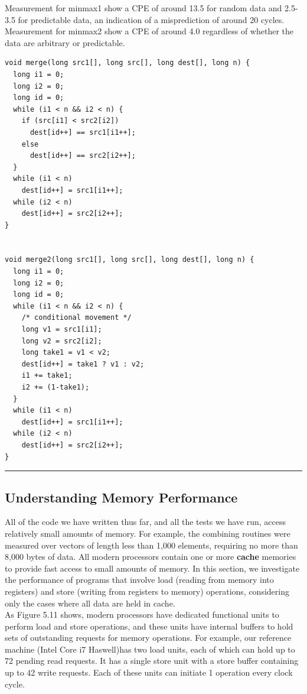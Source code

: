 \documentclass[11pt]{article}
\begin{document}
\begin{enumerate}
\begin{verbatim}
\end{verbatim}

Measurement for minmax1 show a CPE of around 13.5 for random data and 2.5-3.5 for predictable data, an indication of a misprediction of around 20 cycles. Measurement for minmax2 show a CPE of around 4.0 regardless of whether the data are arbitrary or predictable.\\

\begin{verbatim}
void merge(long src1[], long src[], long dest[], long n) {
  long i1 = 0;
  long i2 = 0;
  long id = 0;
  while (i1 < n && i2 < n) {
    if (src[i1] < src2[i2])
      dest[id++] == src1[i1++];
    else
      dest[id++] == src2[i2++];
  }
  while (i1 < n)
    dest[id++] = src1[i1++];
  while (i2 < n)
    dest[id++] = src2[i2++];
}


void merge2(long src1[], long src[], long dest[], long n) {
  long i1 = 0;
  long i2 = 0;
  long id = 0;
  while (i1 < n && i2 < n) {
    /* conditional movement */
    long v1 = src1[i1];
    long v2 = src2[i2];
    long take1 = v1 < v2;
    dest[id++] = take1 ? v1 : v2;
    i1 += take1;
    i2 += (1-take1);
  }
  while (i1 < n)
    dest[id++] = src1[i1++];
  while (i2 < n)
    dest[id++] = src2[i2++];
}

\end{verbatim}

\noindent\rule{\textwidth}{0.5pt}
\end{enumerate}

\subsection{Understanding Memory Performance}
\label{sec:org6b94c04}
All of the code we have written thus far, and all the tests we have run, access relatively small amounts of memory. For example, the combining routines were measured over vectors of length less than 1,000 elements, requiring no more than 8,000 bytes of data. All modern processors contain one or more \textbf{cache} memories to provide fast access to small amounts of memory. In this section, we investigate the performance of programs that involve load (reading from memory into registers) and store (writing from registers to memory) operations, considering only the cases where all data are held in cache.\\


As Figure 5.11 shows, modern processors have dedicated functional units to perform load and store operations, and these units have internal buffers to hold sets of outstanding requests for memory operations. For example, our reference machine (Intel Core i7 Haswell)has two load units, each of which can hold up to 72 pending read requests. It has a single store unit with a store buffer containing up to 42 write requests. Each of these units can initiate 1 operation every clock cycle.\\
\end{document}
